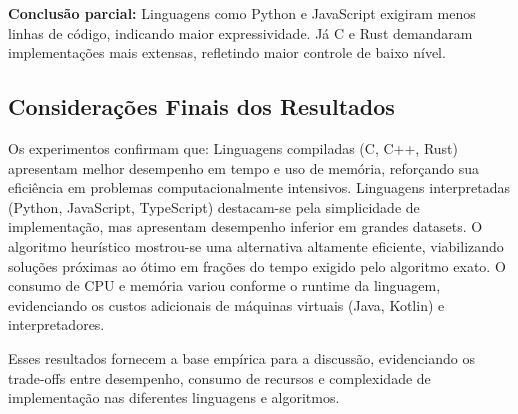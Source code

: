 \documentclass[12pt, a4paper]{article}
\begin{document}
\textbf{Conclusão parcial:} Linguagens como Python e JavaScript exigiram menos linhas de código, indicando maior expressividade. Já C e Rust demandaram implementações mais extensas, refletindo maior controle de baixo nível.

\subsection{Considerações Finais dos Resultados}

Os experimentos confirmam que:  
Linguagens compiladas (C, C++, Rust) apresentam melhor desempenho em tempo e uso de memória, reforçando sua eficiência em problemas computacionalmente intensivos.  
Linguagens interpretadas (Python, JavaScript, TypeScript) destacam-se pela simplicidade de implementação, mas apresentam desempenho inferior em grandes datasets.  
O algoritmo heurístico mostrou-se uma alternativa altamente eficiente, viabilizando soluções próximas ao ótimo em frações do tempo exigido pelo algoritmo exato.  
O consumo de CPU e memória variou conforme o runtime da linguagem, evidenciando os custos adicionais de máquinas virtuais (Java, Kotlin) e interpretadores.  

Esses resultados fornecem a base empírica para a discussão, evidenciando os trade-offs entre desempenho, consumo de recursos e complexidade de implementação nas diferentes linguagens e algoritmos.



\end{document}
